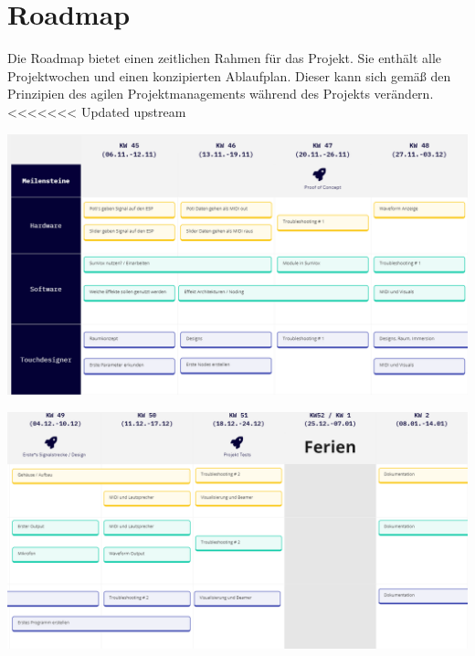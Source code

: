 \documentclass[12pt]{scrartcl}%
\theoremstyle{nonumberplain}
\begin{document}
\section{Roadmap}
Die Roadmap bietet einen zeitlichen Rahmen für das Projekt. Sie enthält alle Projektwochen und einen konzipierten Ablaufplan. Dieser kann sich gemäß den Prinzipien des agilen Projektmanagements während des Projekts verändern.
<<<<<<< Updated upstream
\begin{flushleft}
 \includegraphics[scale=0.4]{road1.png}
\end{flushleft}
\begin{flushleft}
 \includegraphics[scale=0.4]{road2.png}
\end{flushleft}
\end{document}
